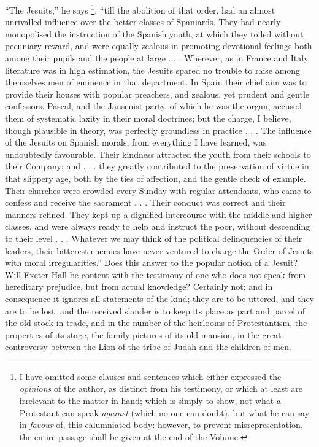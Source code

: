 ``The Jesuits,'' he says \footnote{I have omitted some clauses and
sentences which either expressed the \emph{opinions} of
the author, as distinct from his testimony, or which at
least are irrelevant to the matter in hand; which is
simply to show, not what a Protestant can speak \emph{against}
(which no one can doubt), but what he can say in \emph{favour}
of, this calumniated body: however, to prevent
misrepresentation, the entire
passage shall be given at the end of the Volume.}, ``till the abolition of
that order, had an almost unrivalled influence over the
better classes of Spaniards. They had nearly monopolised
the instruction of the Spanish youth, at which they
toiled without pecuniary reward, and were equally zealous
in promoting devotional feelings both among their pupils
and the people at large . . . Wherever, as in France and
Italy, literature was in high estimation, the Jesuits
spared no trouble to raise among themselves men of
eminence in that department. In Spain their chief aim was
to provide their houses with popular preachers, and
zealous, yet prudent and gentle confessors. Pascal, and
the Jansenist party, of which he was the organ, accused
them of systematic laxity in their moral doctrines; but
the charge, I believe, though plausible in theory, was
perfectly groundless in practice . . . The influence of
the Jesuits on Spanish morals, from everything I have
learned, was undoubtedly favourable. Their kindness
attracted the youth from their schools to their Company;
and . . . they greatly contributed to the preservation of
virtue in that slippery age, both by the ties of
affection, and the gentle check of example. Their
churches were crowded every Sunday with regular
attendants, who came to confess and receive the sacrament
. . . Their conduct was correct and their manners
refined. They kept up a dignified intercourse with the
middle and higher classes, and were always ready to help
and instruct the poor, without descending to their level
. . . Whatever we may think of the political
delinquencies of their leaders, their bitterest enemies
have never ventured to charge the Order of Jesuits with
moral irregularities.'' Does this answer to the
popular notion of a Jesuit? Will Exeter Hall be content
with the testimony of one who does not speak from
hereditary prejudice, but from actual knowledge?
Certainly not; and in consequence it ignores all
statements of the kind; they are to be uttered, and they
are to be lost; and the received slander is to keep its
place as part and parcel of the old stock in trade, and
in the number of the heirlooms of Protestantism, the
properties of its stage, the family pictures of its old mansion, in the great controversy between the Lion of the
tribe of Judah and the children of men.

